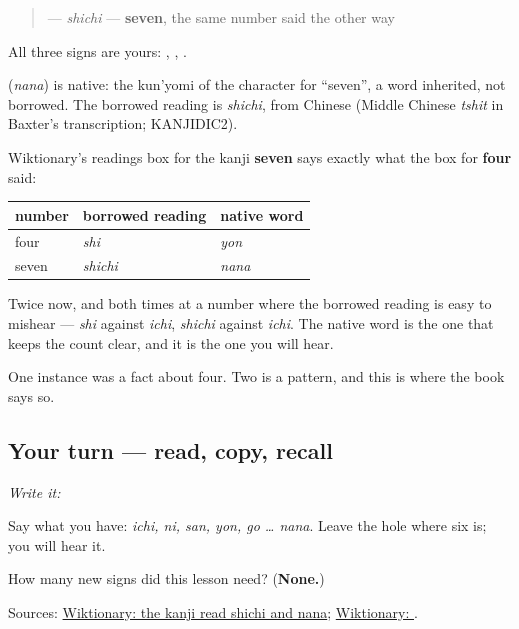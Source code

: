 \begin{quote}
\textbf{} — \emph{shichi} — \textbf{seven}, the same number said the other way
\end{quote}

All three signs are yours: \textbf{}, \textbf{}, \textbf{}.

\begin{cousinweb}
\textbf{} (\emph{nana}) is native: the kun'yomi of the character for \textquotedblleft{}seven\textquotedblright{}, a word inherited, not borrowed. The borrowed reading is \emph{shichi}, from Chinese (Middle Chinese \emph{tshit} in Baxter's transcription; KANJIDIC2).
\end{cousinweb}

\begin{grammarlens}[title={What you've built — the same seam, a second time}]
Wiktionary's readings box for the kanji \textbf{seven} says exactly what the box for \textbf{four} said:

\noindent
\begin{tabularx}{\linewidth}{@{}>{\raggedright\arraybackslash}X>{\raggedright\arraybackslash}X>{\raggedright\arraybackslash}X@{}}
\toprule
\textbf{number} & \textbf{borrowed reading} & \textbf{native word} \\
\midrule
four & \textbf{\ja{し}} \emph{shi} & \textbf{\ja{よん}} \emph{yon} \\
seven & \textbf{\ja{しち}} \emph{shichi} & \textbf{\ja{なな}} \emph{nana} \\
\bottomrule
\end{tabularx}

Twice now, and both times at a number where the borrowed reading is easy to mishear — \emph{shi} against \emph{ichi}, \emph{shichi} against \emph{ichi}. The native word is the one that keeps the count clear, and it is the one you will hear.

One instance was a fact about four. Two is a pattern, and this is where the book says so.
\end{grammarlens}

\subsection*{Your turn — read, copy, recall}
\emph{Write it:} \textbf{}

Say what you have: \emph{ichi, ni, san, yon, go … nana}. Leave the hole where six is; you will hear it.

\begin{tcolorbox}[breakable,colback=teal!4,colframe=teal!35!black,title={Before you move on}]
How many new signs did this lesson need? (\textbf{None.})

Sources: \href{https://en.wiktionary.org/wiki/\%E4\%B8\%83}{Wiktionary: the kanji read shichi and nana}; \href{https://en.wiktionary.org/wiki/\%E3\%81\%AA\%E3\%81\%AA}{Wiktionary: }.
\end{tcolorbox}
